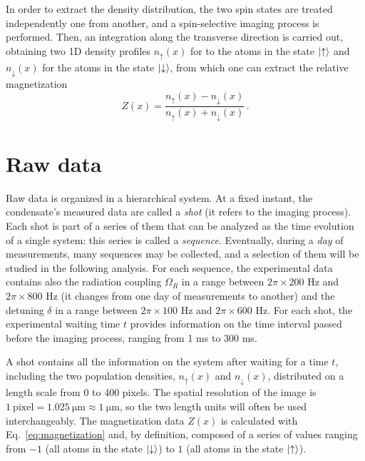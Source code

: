 In order to extract the density distribution, the two spin states are treated independently one from another, and a spin-selective imaging process is performed. Then, an integration along the transverse direction is carried out, obtaining two 1D density profiles $n_\uparrow(x)$ for to the atoms in the state $\ket{\uparrow}$ and $n_\downarrow(x)$ for the atoms in the state $\ket{\downarrow}$, from which one can extract the relative magnetization
\begin{equation}
    Z(x) = \frac{n_\uparrow(x) - n_\downarrow(x)}{n_\uparrow(x) + n_\downarrow(x)}\, .
    \label{eq:magnetization}
\end{equation}

\section{Raw data}
Raw data is organized in a hierarchical system. At a fixed instant, the condensate's measured data are called a \textit{shot} (it refers to the imaging process). Each shot is part of a series of them that can be analyzed as the time evolution of a single system: this series is called a \textit{sequence}. Eventually, during a \textit{day} of measurements, many sequences may be collected, and a selection of them will be studied in the following analysis. For each sequence, the experimental data contains also the radiation coupling $\Omega_R$ in a range between $2\pi \times 200$ \unit{\hertz} and $2\pi \times 800$ \unit{\hertz} (it changes from one day of measurements to another) and the detuning $\delta$ in a range between $2\pi \times 100$ \unit{\hertz} and $2\pi \times 600$ \unit{\hertz}. For each shot, the experimental waiting time $t$ provides information on the time interval passed before the imaging process, ranging from 1 \unit{\milli\second} to 300 \unit{\milli\second}. 

A shot contains all the information on the system after waiting for a time $t$, including the two population densities, $n_\uparrow(x)$ and $n_\downarrow(x)$, distributed on a length scale from 0 to 400 pixels. The spatial resolution of the image is $1\ \text{pixel} = 1.025\ \unit{\micro\meter} \approx 1\ \unit{\micro\meter}$, so the two length units will often be used interchangeably. The magnetization data $Z(x)$ is calculated with Eq.\ \eqref{eq:magnetization} and, by definition, composed of a series of values ranging from $-1$ (all atoms in the state $\ket{\downarrow}$) to $1$ (all atoms in the state $\ket{\uparrow}$).

